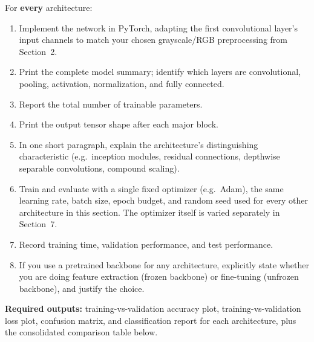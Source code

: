 \documentclass[12pt,a4paper]{article}
\begin{document}
\begin{stepbox}
For \textbf{every} architecture:
\begin{enumerate}[leftmargin=*, label=\arabic*.]
  \item Implement the network in PyTorch, adapting the first convolutional layer's
        input channels to match your chosen grayscale/RGB preprocessing from Section~2.
  \item Print the complete model summary; identify which layers are convolutional,
        pooling, activation, normalization, and fully connected.
  \item Report the total number of trainable parameters.
  \item Print the output tensor shape after each major block.
  \item In one short paragraph, explain the architecture's distinguishing
        characteristic (e.g.\ inception modules, residual connections, depthwise
        separable convolutions, compound scaling).
  \item Train and evaluate with a single fixed optimizer (e.g.\ Adam), the same
        learning rate, batch size, epoch budget, and random seed used for every other
        architecture in this section. The optimizer itself is varied separately in
        Section~7.
  \item Record training time, validation performance, and test performance.
  \item If you use a pretrained backbone for any architecture, explicitly state
        whether you are doing feature extraction (frozen backbone) or fine-tuning
        (unfrozen backbone), and justify the choice.
\end{enumerate}
\end{stepbox}

\textbf{Required outputs:} training-vs-validation accuracy plot, training-vs-validation
loss plot, confusion matrix, and classification report for each architecture, plus the
consolidated comparison table below.
\end{document}
